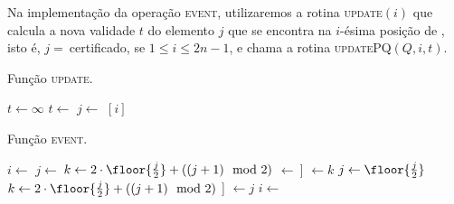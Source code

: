 Na implementação da operação \textsc{event}, utilizaremos a rotina
\textsc{update}$(i)$ que calcula a nova validade $t$ do
elemento $j$ que se encontra na $i$-ésima posição
de \torneio, isto é, $j =~$\torneio[$i$]
certificado, se $1 \leq i \leq 2n - 1$, e chama a rotina
\textsc{updatePQ}$(Q, i, t)$.

\begin{algorithm}[H]
    \caption{Função \textsc{update}.} \label{torneio:update}
\begin{algorithmic}[1]
            \State $t \leftarrow \infty$
        \EndIf
            \State $t \leftarrow $
        \EndIf
        \State $j \leftarrow$ \torneio$[i]$
        \State {}
    \EndFunction
\end{algorithmic}
\end{algorithm}

\begin{algorithm}[H]
    \caption{Função \textsc{event}.} \label{torneio:evento}
\begin{algorithmic}[1]
        \State $i \leftarrow  $ 
        \While{\cert[$i$] = \now}
            \State $j \leftarrow~$\indt[$i$]
            \State $k \leftarrow 2\cdot \floor{\frac{j}{2}} +
            ((j + 1)\mod2)$ 
                \State {}
                $\leftarrow~$\torneio[$j$]
                \State \indt[\torneio[$k$]] $\leftarrow k$
                \State {}
                \State $j \leftarrow \floor{\frac{j}{2}}$
                \State $k \leftarrow 2\cdot \floor{\frac{j}{2}}
                + ((j + 1)\mod2)$
            \EndWhile
            \State \indt[\torneio[$j$]] $\leftarrow j$
            \State {}
            \State $i \leftarrow  $ 
        \EndWhile
    \EndFunction
\end{algorithmic}
\end{algorithm}

